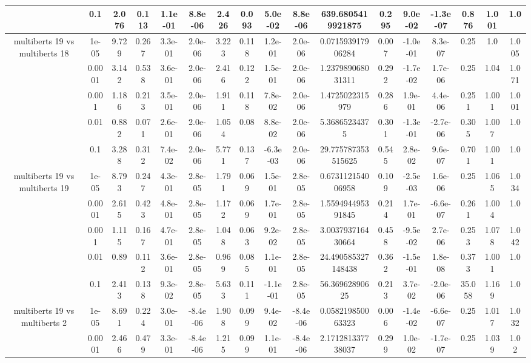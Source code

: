 \begin{tabular}{|c|c|c|c|c|c|c|c|c|c|c|c|c|c|c|c|c|}
 & 0.1 & 2.076 & 0.113 & 1.1e-01 & 8.8e-06 & 2.426 & 0.093 & 5.0e-02 & 8.8e-06 & 639.6805419921875 & 0.295 & 9.0e-02 & -1.3e-07 & 0.876 & 1.001 & 1.0 \\
\hline
\multirow{5}{*}{multiberts 19 vs multiberts 18} & 1e-05 & 9.729 & 0.267 & 3.3e-01 & 2.0e-06 & 3.223 & 0.118 & 1.2e-01 & 2.0e-06 & 0.071593917906284 & 0.007 & -1.0e-01 & 8.3e-07 & 0.25 & 1.0 & 1.005 \\
 & 0.0001 & 3.142 & 0.538 & 3.6e-01 & 2.0e-06 & 2.416 & 0.122 & 1.5e-01 & 2.0e-06 & 1.237989068031311 & 0.292 & -1.7e-02 & 1.7e-06 & 0.25 & 1.04 & 1.071 \\
 & 0.001 & 1.186 & 0.213 & 3.5e-01 & 2.0e-06 & 1.911 & 0.118 & 7.8e-02 & 2.0e-06 & 1.4725022315979 & 0.286 & 1.9e-01 & 4.4e-06 & 0.251 & 1.001 & 1.001 \\
 & 0.01 & 0.882 & 0.071 & 2.6e-01 & 2.0e-06 & 1.054 & 0.08 & 8.8e-02 & 2.0e-06 & 5.36865234375 & 0.301 & -1.3e-01 & -2.7e-06 & 0.305 & 1.007 & 1.0 \\
 & 0.1 & 3.288 & 0.312 & 7.4e-02 & 2.0e-06 & 5.771 & 0.137 & -6.3e-03 & 2.0e-06 & 29.775787353515625 & 0.545 & 2.8e-02 & 9.6e-07 & 0.701 & 1.001 & 1.0 \\
\hline
\multirow{5}{*}{multiberts 19 vs multiberts 19} & 1e-05 & 8.793 & 0.247 & 4.3e-01 & 2.8e-05 & 1.791 & 0.069 & 1.5e-01 & 2.8e-05 & 0.673112154006958 & 0.109 & -2.5e-03 & 1.6e-06 & 0.25 & 1.065 & 1.034 \\
 & 0.0001 & 2.615 & 0.423 & 4.8e-01 & 2.8e-05 & 1.172 & 0.069 & 1.7e-01 & 2.8e-05 & 1.559494495391845 & 0.214 & 1.7e-01 & -6.6e-07 & 0.261 & 1.004 & 1.0 \\
 & 0.001 & 1.115 & 0.167 & 4.7e-01 & 2.8e-05 & 1.048 & 0.063 & 9.2e-02 & 2.8e-05 & 3.003793716430664 & 0.458 & -9.5e-02 & 2.7e-06 & 0.253 & 1.078 & 1.042 \\
 & 0.01 & 0.89 & 0.112 & 3.6e-01 & 2.8e-05 & 0.969 & 0.085 & 1.1e-01 & 2.8e-05 & 24.490585327148438 & 0.362 & -1.5e-01 & 1.8e-08 & 0.373 & 1.001 & 1.0 \\
 & 0.1 & 2.413 & 0.138 & 9.3e-02 & 2.8e-05 & 5.633 & 0.111 & -1.1e-01 & 2.8e-05 & 56.36962890625 & 0.213 & 3.7e-02 & -2.0e-06 & 35.058 & 1.169 & 1.0 \\
\hline
\multirow{5}{*}{multiberts 19 vs multiberts 2} & 1e-05 & 8.691 & 0.224 & 3.0e-01 & -8.4e-06 & 1.908 & 0.099 & 9.4e-02 & -8.4e-06 & 0.058219850063323 & 0.006 & -1.4e-02 & -6.6e-07 & 0.25 & 1.017 & 1.032 \\
 & 0.0001 & 2.466 & 0.479 & 3.3e-01 & -8.4e-06 & 1.215 & 0.099 & 1.1e-01 & -8.4e-06 & 2.171281337738037 & 0.299 & 1.0e-02 & -1.7e-07 & 0.25 & 1.039 & 1.02 \\

\end{tabular}
